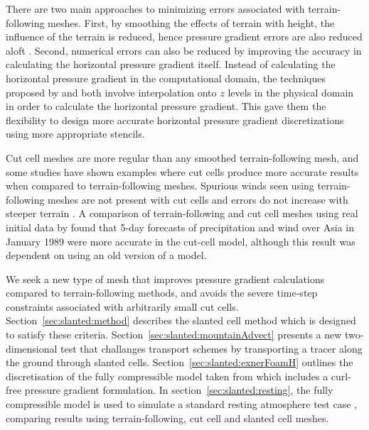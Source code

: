 There are two main approaches to minimizing errors associated with terrain-following meshes.
First, by smoothing the effects of terrain with height, the influence of the terrain is reduced, hence pressure gradient errors are also reduced aloft \citep{schaer2002,leuenberger2010,klemp2011}.
Second, numerical errors can also be reduced by improving the accuracy in calculating the horizontal pressure gradient itself.  Instead of calculating the horizontal pressure gradient in the computational domain, the techniques proposed by \citet{klemp2011} and \citet{zaengl2012} both involve interpolation onto $z$ levels in the physical domain in order to calculate the horizontal pressure gradient.  This gave them the flexibility to design more accurate horizontal pressure gradient discretizations using more appropriate stencils.

Cut cell meshes are more regular than any smoothed terrain-following mesh, and some studies have shown examples where cut cells produce more accurate results when compared to terrain-following meshes.
Spurious winds seen using terrain-following meshes are not present with cut cells and errors do not increase with steeper terrain \citep{good2014}.
A comparison of terrain-following and cut cell meshes using real initial data by \citet{steppeler2013} found that 5-day forecasts of precipitation and wind over Asia in January 1989 were more accurate in the cut-cell model, although this result was dependent on using an old version of a model.


We seek a new type of mesh that improves pressure gradient calculations compared to terrain-following methods, and avoids the severe time-step constraints associated with arbitrarily small cut cells.  Section~\ref{sec:slanted:method} describes the slanted cell method which is designed to satisfy these criteria.
Section~\ref{sec:slanted:mountainAdvect} presents a new two-dimensional test that challanges transport schemes by transporting a tracer along the ground through slanted cells.
Section~\ref{sec:slanted:exnerFoamH} outlines the discretisation of the fully compressible model taken from \citet{weller-shahrokhi2014} which includes a curl-free pressure gradient formulation.  In section~\ref{sec:slanted:resting}, the fully compressible model is used to simulate a standard resting atmosphere test case \citep{klemp2011}, comparing results using terrain-following, cut cell and slanted cell meshes.





